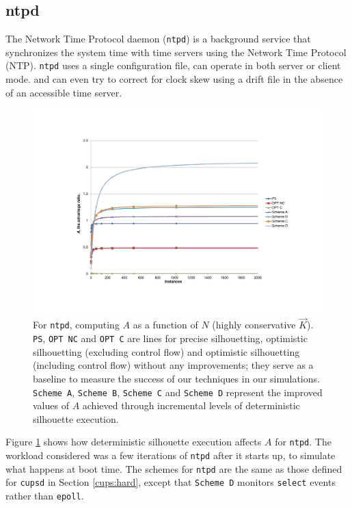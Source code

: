 \newpage
\subsection{ntpd}
The Network Time Protocol daemon (\texttt{ntpd}) is a background
service that synchronizes the system time with time servers
using the Network Time Protocol (NTP). \texttt{ntpd}
uses a single configuration file, can operate in both server or client
mode. and can even try to correct for clock skew using a drift file
in the absence of an accessible time server.

\begin{figure}[h]
  \center
  \includegraphics[scale=0.80, trim=5cm 3cm 0cm 3cm]{ntp-1.pdf}
  \caption[For \texttt{ntp}, $A$ as a function of $N$ (highly conservative $\vec K$)]%
          {
            For \texttt{ntpd}, computing $A$ as a function of $N$ (highly conservative $\vec K$).\newline
            \texttt{PS}, \texttt{OPT NC} and \texttt{OPT C} are lines for precise silhouetting, optimistic 
            silhouetting (excluding control flow) and optimistic silhouetting
            (including control flow) without any improvements; they
            serve as a baseline to measure the success of our techniques
            in our simulations. \texttt{Scheme A}, \texttt{Scheme B}, \texttt{Scheme C} and
            \texttt{Scheme D} represent the improved values of $A$
            achieved through incremental levels of deterministic silhouette execution.
          }
  \label{ntp1}
\end{figure}

\newpage
Figure \ref{ntp1} shows how deterministic silhouette execution affects
$A$ for \texttt{ntpd}. The workload considered was a few
iterations of \texttt{ntpd} after it starts up, to simulate
what happens at boot time. The schemes 
for \texttt{ntpd} are the same as those defined for \texttt{cupsd}
in Section \ref{cups:hard}, except that \texttt{Scheme D} 
monitors \texttt{select} events rather than \texttt{epoll}.

